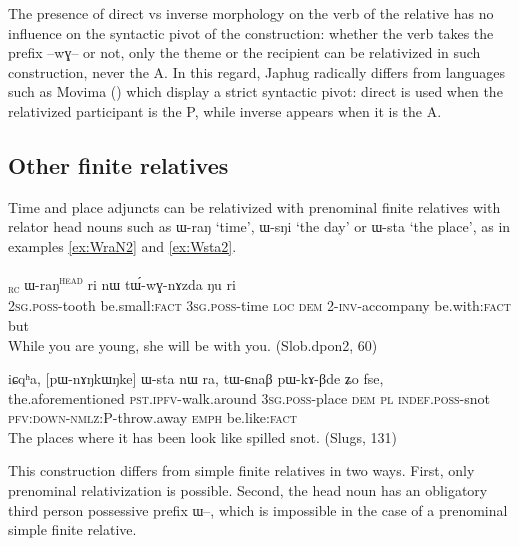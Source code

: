 \documentclass[oldfontcommands,oneside,a4paper,11pt]{article}
\newcommand{\ipa}[1]{{\phon #1}} %
\newcommand{\topic}{\textsc{dem}}
\newcommand{\tete}{\textsuperscript{\textsc{head}}}
\newcommand{\rc}{\textsubscript{\textsc{rc}}}
\begin{document}
The presence of direct vs inverse morphology on the verb of the relative has no influence on the syntactic pivot of the construction: whether the verb takes the prefix \ipa{--wɣ--} or not, only the theme or the recipient can be relativized in such construction, never the A. In this regard, Japhug radically differs from languages such as Movima (\citealt[526-7]{haude09hierarchical}) which display a strict syntactic pivot: direct is used when the relativized participant is the P, while inverse appears when it is the A.


\subsection{Other finite relatives} \label{sec:finite-adjunct}
Time and place adjuncts can be relativized with prenominal finite relatives with  relator head nouns such as \ipa{ɯ-raŋ} `time', \ipa{ɯ-sŋi} `the day' or \ipa{ɯ-sta} `the place', as in examples  \ref{ex:WraN2} and \ref{ex:Wsta2}.

\begin{exe}
   \ex \label{ex:WraN2}
 \gll [\ipa{nɤ-ɕɣa}   	\ipa{xtɕi}]\rc{}   	\ipa{ɯ-raŋ}\tete{}   	\ipa{ri}   	\ipa{nɯ}   	\ipa{tɯ́-wɣ-nɤzda}   	\ipa{ŋu}   	\ipa{ri}   \\
 \textsc{2sg.poss}-tooth be.small:\textsc{fact} \textsc{3sg.poss}-time \textsc{loc} \topic{} 2-\textsc{inv}-accompany be.with:\textsc{fact} but \\
\glt While you are young, she will be with you. (Slob.dpon2, 60)
\end{exe}

\begin{exe}
   \ex \label{ex:Wsta2}
 \gll
\ipa{iɕqʰa,}  	[\ipa{pɯ-nɤŋkɯŋke}]  	\ipa{ɯ-sta}  	\ipa{nɯ} \ipa{ra,}  	\ipa{tɯ-ɕnaβ}  	\ipa{pɯ-kɤ-βde}  	\ipa{ʑo}  	\ipa{fse,}  \\
the.aforementioned \textsc{pst.ipfv}-walk.around \textsc{3sg.poss}-place \topic{} \textsc{pl} \textsc{indef.poss}-snot \textsc{pfv:down-nmlz:P}-throw.away \textsc{emph} be.like:\textsc{fact} \\
\glt The places where it has been look like spilled snot. (Slugs, 131)
\end{exe}

This construction differs from simple finite relatives in two ways. First, only prenominal relativization is possible. Second, the  head noun has an obligatory third person possessive prefix \ipa{ɯ--}, which is impossible in the case of a prenominal simple finite relative.
\end{document}
